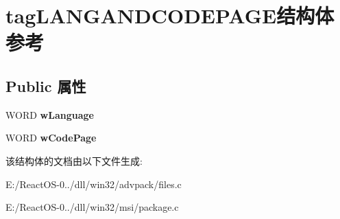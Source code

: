 \hypertarget{structtag_l_a_n_g_a_n_d_c_o_d_e_p_a_g_e}{}\section{tag\+L\+A\+N\+G\+A\+N\+D\+C\+O\+D\+E\+P\+A\+G\+E结构体 参考}
\label{structtag_l_a_n_g_a_n_d_c_o_d_e_p_a_g_e}
\subsection*{Public 属性}
\begin{DoxyCompactItemize}
\item 
\mbox{\label{structtag_l_a_n_g_a_n_d_c_o_d_e_p_a_g_e_abfbcd9ad201088fcc93e63737bc2cafe}} 
W\+O\+RD {\bfseries w\+Language}
\item 
\mbox{\label{structtag_l_a_n_g_a_n_d_c_o_d_e_p_a_g_e_a431c7bb23602e2201c6ca14bf2b0533b}} 
W\+O\+RD {\bfseries w\+Code\+Page}
\end{DoxyCompactItemize}


该结构体的文档由以下文件生成\+:\begin{DoxyCompactItemize}
\item 
E\+:/\+React\+O\+S-\/0../dll/win32/advpack/files.\+c\item 
E\+:/\+React\+O\+S-\/0../dll/win32/msi/package.\+c\end{DoxyCompactItemize}
